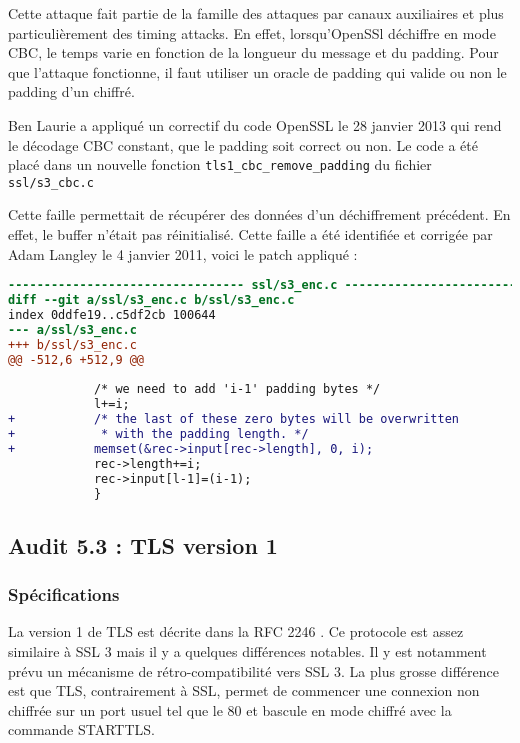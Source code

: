
Cette attaque \cite{vaudenay2002} fait partie de la famille des attaques par canaux auxiliaires et plus particulièrement des timing attacks. En effet, lorsqu'OpenSSl déchiffre en mode CBC, le temps varie en fonction de la longueur du message et du padding. Pour que l'attaque fonctionne, il faut utiliser un oracle de padding qui valide ou non le padding d'un chiffré.

Ben Laurie a appliqué un correctif du code OpenSSL le 28 janvier 2013 qui rend le décodage CBC constant, que le padding soit correct ou non. Le code a été placé dans un nouvelle fonction \verb+tls1_cbc_remove_padding+ du fichier \verb+ssl/s3_cbc.c+


Cette faille permettait de récupérer des données d'un déchiffrement précédent. En effet, le buffer n'était pas réinitialisé. Cette faille a été identifiée \cite{CVE20114576} et corrigée par Adam Langley le 4 janvier 2011, voici le patch appliqué :

\begin{lstlisting}[language=diff,caption=patch-cve-2011-4576, label=patch-cve-2011-4576]
--------------------------------- ssl/s3_enc.c --------------------------------
diff --git a/ssl/s3_enc.c b/ssl/s3_enc.c
index 0ddfe19..c5df2cb 100644
--- a/ssl/s3_enc.c
+++ b/ssl/s3_enc.c
@@ -512,6 +512,9 @@
 
            /* we need to add 'i-1' padding bytes */
            l+=i;
+           /* the last of these zero bytes will be overwritten
+            * with the padding length. */
+           memset(&rec->input[rec->length], 0, i);
            rec->length+=i;
            rec->input[l-1]=(i-1);
            }
\end{lstlisting}


\subsection{Audit 5.3 : TLS version 1}
\subsubsection{Spécifications}

La version 1 de TLS est décrite dans la RFC 2246 \cite{rfc2246}. Ce protocole est assez similaire à SSL 3 mais il y a quelques différences notables. Il y est notamment prévu un mécanisme de rétro-compatibilité vers SSL 3. La plus grosse différence est que TLS, contrairement à SSL, permet de commencer une connexion non chiffrée sur un port usuel tel que le 80 et bascule en mode chiffré avec la commande STARTTLS.

